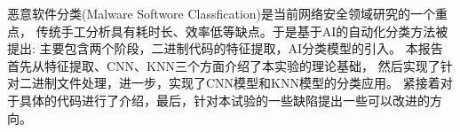 恶意软件分类(Malware Softwore Classfication)是当前网络安全领域研究的一个重点，
传统手工分析具有耗时长、效率低等缺点。于是基于AI的自动化分类方法被提出:
主要包含两个阶段，二进制代码的特征提取，AI分类模型的引入。
本报告首先从特征提取、CNN、KNN三个方面介绍了本实验的理论基础，
然后实现了针对二进制文件处理，进一步，实现了CNN模型和KNN模型的分类应用。
紧接着对于具体的代码进行了介绍，最后，针对本试验的一些缺陷提出一些可以改进的方向。